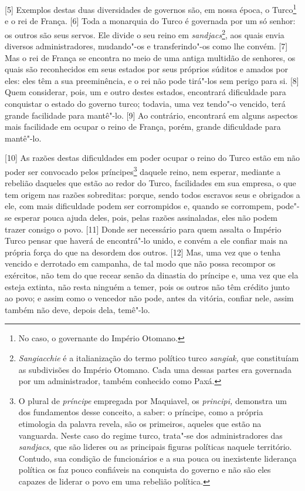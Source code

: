 {[}5{]} Exemplos destas duas diversidades de governos são, em nossa
época, o Turco\footnote{No caso, o governante do Império Otomano.} e o
rei de França. {[}6{]} Toda a monarquia do Turco é governada por um só
senhor: os outros são seus servos. Ele divide o seu reino em
\emph{sandjacs}\footnote{\emph{Sangiacchie} é a italianização do termo
  político turco \emph{sangiak,} que constituíam as subdivisões do
  Império Otomano. Cada uma dessas partes era governada por um
  administrador, também conhecido como Paxá.}, aos quais envia diversos
administradores, mudando"-os e transferindo"-os como lhe convém. {[}7{]}
Mas o rei de França se encontra no meio de uma antiga multidão de
senhores, os quais são reconhecidos em seus estados por seus próprios
súditos e amados por eles: eles têm a sua preeminência, e o rei não pode
tirá"-los sem perigo para si. {[}8{]} Quem considerar, pois, um e outro
destes estados, encontrará dificuldade para conquistar o estado do
governo turco; todavia, uma vez tendo"-o vencido, terá grande facilidade
para mantê"-lo. {[}9{]} Ao contrário, encontrará em alguns aspectos mais
facilidade em ocupar o reino de França, porém, grande dificuldade para
mantê"-lo.

{[}10{]} As razões destas dificuldades em poder ocupar o reino do Turco
estão em não poder ser convocado pelos príncipes\footnote{O plural de
  \emph{príncipe} empregada por Maquiavel, os \emph{principi,} demonstra
  um dos fundamentos desse conceito, a saber: o príncipe, como a própria
  etimologia da palavra revela, são os primeiros, aqueles que estão na
  vanguarda. Neste caso do regime turco, trata"-se dos administradores
  das \emph{sandjacs}, que são lideres ou as principais figuras
  políticas naquele território. Contudo, sua condição de funcionários e
  a sua pouca ou inexistente liderança política os faz pouco confiáveis
  na conquista do governo e não são eles capazes de liderar o povo em
  uma rebelião política.} daquele reino, nem esperar, mediante a
rebelião daqueles que estão ao redor do Turco, facilidades em sua
empresa, o que tem origem nas razões sobreditas: porque, sendo todos
escravos seus e obrigados a ele, com mais dificuldade podem ser
corrompidos e, quando se corrompem, pode"-se esperar pouca ajuda deles,
pois, pelas razões assinaladas, eles não podem trazer consigo o povo.
{[}11{]} Donde ser necessário para quem assalta o Império Turco pensar
que haverá de encontrá"-lo unido, e convém a ele confiar mais na própria
força do que na desordem dos outros. {[}12{]} Mas, uma vez que o tenha
vencido e derrotado em campanha, de tal modo que não possa recompor os
exércitos, não tem do que recear senão da dinastia do príncipe e, uma
vez que ela esteja extinta, não resta ninguém a temer, pois os outros
não têm crédito junto ao povo; e assim como o vencedor não pode, antes
da vitória, confiar nele, assim também não deve, depois dela, temê"-lo.

